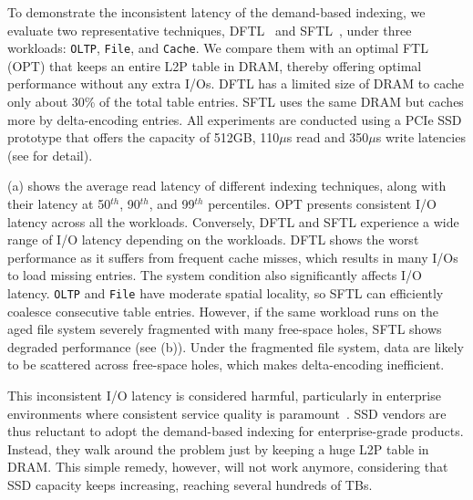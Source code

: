 To demonstrate the inconsistent latency of the demand-based indexing, we
evaluate two representative techniques, DFTL~\cite{dftl} and SFTL~\cite{sftl},
under three workloads: \texttt{OLTP}, \texttt{File}, and \texttt{Cache}.  We compare them with an
optimal FTL (OPT) that keeps an entire L2P table in DRAM, thereby offering
optimal performance without any extra I/Os.  DFTL has a limited size of DRAM to
cache only about 30\% of the total table entries.  SFTL uses the same DRAM but caches
more by delta-encoding entries.  All experiments are conducted using a PCIe SSD
prototype that offers the capacity of 512GB, 110$\mu$s read and 350$\mu$s write
latencies (see  for detail).

(a) shows the average read latency of different indexing techniques, along with their latency
at 50$^{th}$, 90$^{th}$, and 99$^{th}$ percentiles.  OPT presents consistent
I/O latency across all the workloads. Conversely, DFTL and SFTL experience a wide range of I/O latency depending on the workloads.
DFTL shows the worst performance
as it suffers from frequent cache misses, which results in many I/Os to load
missing entries.  The system condition also significantly affects I/O latency.
\texttt{OLTP} and \texttt{File} have moderate spatial locality, so SFTL can
efficiently coalesce consecutive table entries.  However, if the same workload
runs on the aged file system severely fragmented with many free-space holes,
SFTL shows degraded performance (see (b)).  Under the fragmented
file system, data are likely to be scattered across free-space holes, which
makes delta-encoding inefficient.

This inconsistent I/O latency is considered harmful, particularly in
enterprise environments where consistent service quality is
paramount~\cite{cloud, silk, udepot}.  SSD vendors are thus reluctant to adopt the
demand-based indexing for enterprise-grade products. Instead, they walk around
the problem just by keeping a huge L2P table in DRAM. This simple remedy,
however, will not work anymore, considering that SSD capacity keeps increasing,
reaching several hundreds of TBs.

